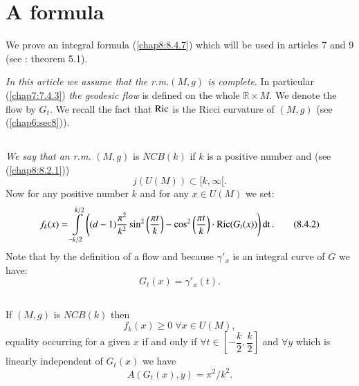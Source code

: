 \section{A formula}\label{chap8:sec4}

We prove an integral formula (\ref{chap8:8.4.7}) which will be used in
articles 7 and 9 (see \cite{13}: theorem 5.1).

{\em In this article we assume that the r.m.\@ $(M,g)$ is
  complete}. In particular (\ref{chap7:7.4.3}) {\em the geodesic flow} is
defined on the whole $\mathbb{R}\times M$. We denote the flow by
$G_{t}$. We recall the fact that $\operatorname{Ric}$ is the Ricci curvature of
$(M,g)$ (see (\ref{chap6:sec8})).

\subsection{}\label{chap8:8.4.1}

\begin{defi*}
{\em We say that an r.m.} $(M,g)$ is $NCB(k)$ if $k$ is a positive
number and (see (\ref{chap8:8.2.1}))
$$
j(U(M))\subset [k,\infty[.
$$
Now \pageoriginale for any positive number $k$ and for any $x\in U(M)$
we set:
\begin{equation*}
f_{k}(x)=\int\limits^{k/2}_{-k/2}\left((d-1)
\frac{\pi^{2}}{k^{2}}\sin^{2} \left(\frac{\pi t}{k}\right) -
\cos^{2}\left(\frac{\pi t}{k}\right)\cdot
\operatorname{Ric}(G_{t}(x))\right)\operatorname{dt}.\tag{8.4.2}\label{chap8:8.4.2} 
\end{equation*}
Note that by the definition of a flow and because $\gamma'_{x}$ is an
integral curve of $G$ we have:
$$
G_{t}(x)=\gamma'_{x}(t).
$$
\end{defi*}

\setcounter{subsection}{2}

\subsection{}\label{chap8:8.4.3}

\begin{prop*}
If $(M,g)$ is $NCB(k)$ then
$$
f_{k}(x)\geq 0 \; \forall x\in U(M),
$$
equality occurring for a given $x$ if and only if $\forall t\in
\left[-\dfrac{k}{2},\dfrac{k}{2}\right]$ and $\forall y$ which is
linearly independent of $G_{t}(x)$ we have
$$
A(G_{t}(x),y)=\pi^{2}/k^{2}.
$$
\end{prop*}

